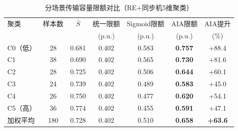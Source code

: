 \begin{table}[htbp]
\centering
\caption{分场景传输容量限额对比（RE+同步机5维聚类）}
\label{tab:transfer_limits}
\begin{tabular}{lcccccc}
\toprule
聚类 & 样本数 & $\bar{S}$ & 统一限额 & Sigmoid限额 & AIA限额 & AIA提升 \\
 & & & (p.u.) & (p.u.) & (p.u.) & (\%) \\
\midrule
C0（低） & 28 & 0.681 & 0.402 & 0.583 & \textbf{0.757} & +88.4 \\
C1 & 38 & 0.690 & 0.402 & 0.565 & \textbf{0.730} & +81.6 \\
C2 & 28 & 0.725 & 0.402 & 0.506 & \textbf{0.644} & +60.1 \\
C3 & 24 & 0.739 & 0.402 & 0.489 & \textbf{0.583} & +45.0 \\
C4 & 26 & 0.750 & 0.402 & 0.477 & \textbf{0.620} & +54.1 \\
C5（高） & 36 & 0.774 & 0.402 & 0.455 & \textbf{0.591} & +47.1 \\
\midrule
加权平均 & 180 & 0.728 & 0.402 & 0.510 & \textbf{0.658} & \textbf{+63.6} \\
\bottomrule
\end{tabular}
\end{table}
